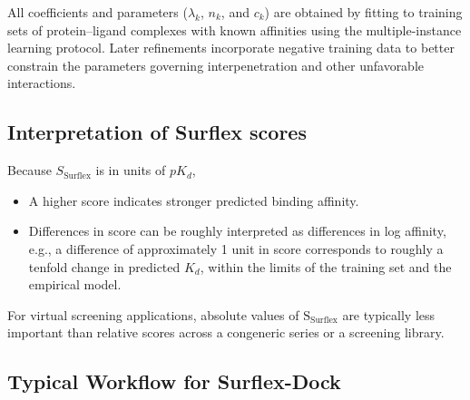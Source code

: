 \documentclass[12pt, a4paper]{article}
\begin{document}
All coefficients and parameters ($\lambda_{k}$, $n_{k}$, and $c_{k}$) are obtained by fitting to training sets of protein--ligand complexes with known affinities using the multiple-instance learning protocol. Later refinements incorporate negative training data to better constrain the parameters governing interpenetration and other unfavorable interactions.\cite{CH7_Jain2006NegTrain}

\subsection{Interpretation of Surflex scores}

Because \(S_{\text{Surflex}}\) is in units of \(pK_d\),
\begin{itemize}
  \item A higher score indicates stronger predicted binding affinity.
  \item Differences in score can be roughly interpreted as differences in log affinity, e.g., a difference of approximately 1 unit in score corresponds to roughly a tenfold change in predicted \(K_d\), within the limits of the training set and the empirical model.
\end{itemize}

For virtual screening applications, absolute values of $\text{S}_{\text{Surflex}}$ are typically less important than relative scores across a congeneric series or a screening library.\cite{CH7_Jain2007Surflex21,CH7_Jain2006NegTrain}


\subsection{Typical Workflow for Surflex-Dock}
\end{document}
